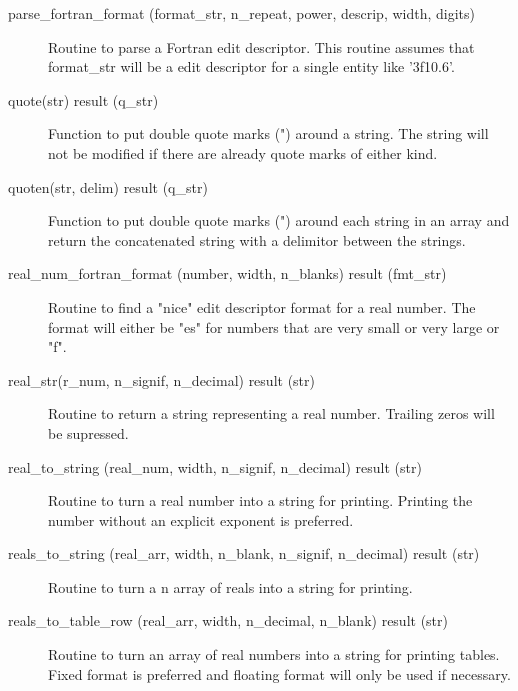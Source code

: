 \begin{description}
\label{r:parse.fortran.format}
\item[parse_fortran_format (format_str, n_repeat, power, descrip, width, digits)] \Newline 
Routine to parse a Fortran edit descriptor.
This routine assumes that format_str will be a edit descriptor for a single entity like '3f10.6'.

\label{r:quote}
\item[quote(str) result (q_str)] \Newline 
Function to put double quote marks (") around a string.
The string will not be modified if there are already quote marks of either kind.

\label{r:quoten}
\item[quoten(str, delim) result (q_str)] \Newline 
Function to put double quote marks (") around each string in an array and
return the concatenated string with a delimitor between the strings.

\label{r:real.num.fortran.format}
\item[real_num_fortran_format (number, width, n_blanks) result (fmt_str)] \Newline 
Routine to find a "nice" edit descriptor format for a real number.
The format will either be "es" for numbers that are very small or very large or "f".

\label{r:real.str}
\item[real_str(r_num, n_signif, n_decimal) result (str)] \Newline 
Routine to return a string representing a real number.
Trailing zeros will be supressed. 

\label{r:real.to.string}
\item[real_to_string (real_num, width, n_signif, n_decimal) result (str)] \Newline 
Routine to turn a real number into a string for printing. 
Printing the number without an explicit exponent is preferred.

\label{r:reals.to.string}
\item[reals_to_string (real_arr, width, n_blank, n_signif, n_decimal) result (str)] \Newline 
Routine to turn a n array of reals into a string for printing. 

\label{r:reals.to.table.row}
\item[reals_to_table_row (real_arr, width, n_decimal, n_blank) result (str)] \Newline 
Routine to turn an array of real numbers into a string for printing tables.
Fixed format is preferred and floating format will only be used if necessary.


\end{description}
